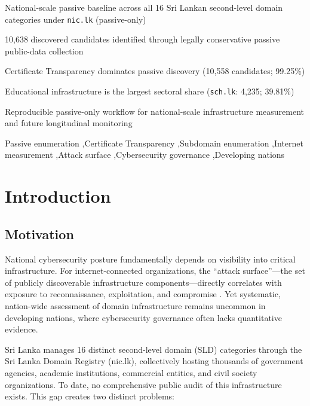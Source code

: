 \documentclass[preprint,review,12pt]{elsarticle}
\begin{document}
\begin{frontmatter}
\begin{highlights}
\item National-scale passive baseline across all 16 Sri Lankan second-level domain categories under \texttt{nic.lk} (passive-only)
\item 10,638 discovered candidates identified through legally conservative passive public-data collection
\item Certificate Transparency dominates passive discovery (10,558 candidates; 99.25\%)
\item Educational infrastructure is the largest sectoral share (\texttt{sch.lk}: 4,235; 39.81\%)
\item Reproducible passive-only workflow for national-scale infrastructure measurement and future longitudinal monitoring
\end{highlights}

\begin{keyword}
Passive enumeration \sep Certificate Transparency \sep Subdomain enumeration \sep Internet measurement \sep Attack surface \sep Cybersecurity governance \sep Developing nations
\end{keyword}

\end{frontmatter}

\linenumbers

\section{Introduction}
\label{sec:intro}

\subsection{Motivation}

National cybersecurity posture fundamentally depends on visibility into critical infrastructure. For internet-connected organizations, the ``attack surface''—the set of publicly discoverable infrastructure components—directly correlates with exposure to reconnaissance, exploitation, and compromise \cite{durumeric2013zmap}. Yet systematic, nation-wide assessment of domain infrastructure remains uncommon in developing nations, where cybersecurity governance often lacks quantitative evidence.

Sri Lanka manages 16 distinct second-level domain (SLD) categories through the Sri Lanka Domain Registry (nic.lk), collectively hosting thousands of government agencies, academic institutions, commercial entities, and civil society organizations. To date, no comprehensive public audit of this infrastructure exists. This gap creates two distinct problems:
\end{document}
